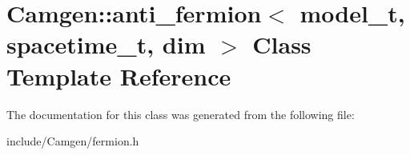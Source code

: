 \hypertarget{a00007}{\section{Camgen\-:\-:anti\-\_\-fermion$<$ model\-\_\-t, spacetime\-\_\-t, dim $>$ Class Template Reference}
\label{a00007}
}


The documentation for this class was generated from the following file\-:\begin{DoxyCompactItemize}
\item 
include/\-Camgen/fermion.\-h\end{DoxyCompactItemize}

